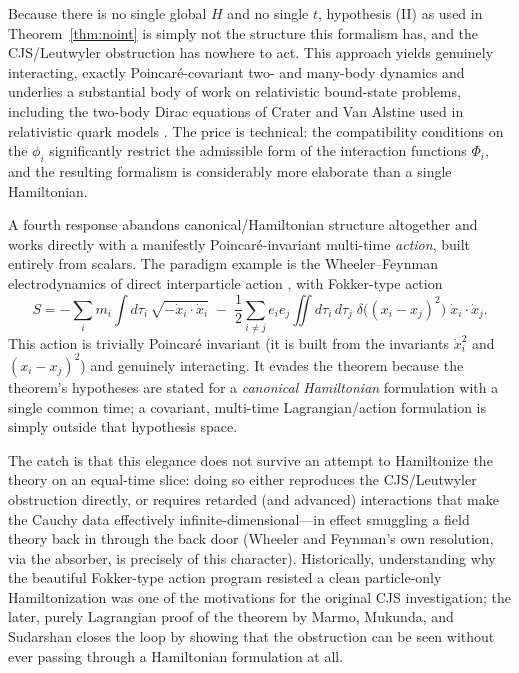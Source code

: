 Because there is no single global $H$ and no single $t$, hypothesis (II) as
used in Theorem~\ref{thm:noint} is simply not the structure this formalism has,
and the CJS/Leutwyler obstruction has nowhere to act. This approach yields
genuinely interacting, exactly Poincar\'e-covariant two- and many-body dynamics
and underlies a substantial body of work on relativistic bound-state problems,
including the two-body Dirac equations of Crater and Van Alstine used in
relativistic quark models \cite{CraterVanAlstine}. The price is technical: the
compatibility conditions on the $\phi_i$ significantly restrict the admissible
form of the interaction functions $\Phi_i$, and the resulting formalism is
considerably more elaborate than a single Hamiltonian.

A fourth response abandons canonical/Hamiltonian structure altogether and works
directly with a manifestly Poincar\'e-invariant multi-time \emph{action}, built
entirely from scalars. The paradigm example is the Wheeler--Feynman
electrodynamics of direct interparticle action , with Fokker-type action
\begin{equation}
S = -\sum_i m_i\int d\tau_i\,\sqrt{-\dot x_i\cdot\dot x_i}\; 
    -\;\frac12\sum_{i\ne j} e_ie_j \iint d\tau_i\,d\tau_j\;
    \delta\big((x_i-x_j)^2\big)\;\dot x_i\cdot\dot x_j .
\end{equation}
This action is trivially Poincar\'e invariant (it is built from the invariants
$\dot x_i^2$ and $(x_i-x_j)^2$) and genuinely interacting. It evades the
theorem because the theorem's hypotheses are stated for a \emph{canonical
Hamiltonian} formulation with a single common time; a covariant, multi-time
Lagrangian/action formulation is simply outside that hypothesis space.

The catch is that this elegance does not survive an attempt to Hamiltonize the
theory on an equal-time slice: doing so either reproduces the CJS/Leutwyler
obstruction directly, or requires retarded (and advanced) interactions that
make the Cauchy data effectively infinite-dimensional---in effect smuggling a
field theory back in through the back door (Wheeler and Feynman's own
resolution, via the absorber, is precisely of this character). Historically,
understanding why the beautiful Fokker-type action program resisted a clean
particle-only Hamiltonization was one of the motivations for the original CJS
investigation; the later, purely Lagrangian proof of the theorem by Marmo,
Mukunda, and Sudarshan  closes the loop by showing that the obstruction can be
seen without ever passing through a Hamiltonian formulation at all.

